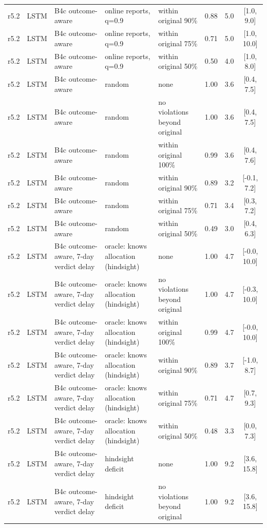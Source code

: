 \begin{longtable}{lllp{4.2cm}p{3.4cm}ccc}
r5.2 & LSTM & B4c outcome-aware & online reports, q=0.9 & within original 90\% & 0.88 & 5.0 & [1.0, 9.0] \\
r5.2 & LSTM & B4c outcome-aware & online reports, q=0.9 & within original 75\% & 0.71 & 5.0 & [1.0, 10.0] \\
r5.2 & LSTM & B4c outcome-aware & online reports, q=0.9 & within original 50\% & 0.50 & 4.0 & [1.0, 8.0] \\
r5.2 & LSTM & B4c outcome-aware & random & none & 1.00 & 3.6 & [0.4, 7.5] \\
r5.2 & LSTM & B4c outcome-aware & random & no violations beyond original & 1.00 & 3.6 & [0.4, 7.5] \\
r5.2 & LSTM & B4c outcome-aware & random & within original 100\% & 0.99 & 3.6 & [0.4, 7.6] \\
r5.2 & LSTM & B4c outcome-aware & random & within original 90\% & 0.89 & 3.2 & [-0.1, 7.2] \\
r5.2 & LSTM & B4c outcome-aware & random & within original 75\% & 0.71 & 3.4 & [0.3, 7.2] \\
r5.2 & LSTM & B4c outcome-aware & random & within original 50\% & 0.49 & 3.0 & [0.4, 6.3] \\
r5.2 & LSTM & B4c outcome-aware, 7-day verdict delay & oracle: knows allocation (hindsight) & none & 1.00 & 4.7 & [-0.0, 10.0] \\
r5.2 & LSTM & B4c outcome-aware, 7-day verdict delay & oracle: knows allocation (hindsight) & no violations beyond original & 1.00 & 4.7 & [-0.3, 10.0] \\
r5.2 & LSTM & B4c outcome-aware, 7-day verdict delay & oracle: knows allocation (hindsight) & within original 100\% & 0.99 & 4.7 & [-0.0, 10.0] \\
r5.2 & LSTM & B4c outcome-aware, 7-day verdict delay & oracle: knows allocation (hindsight) & within original 90\% & 0.89 & 3.7 & [-1.0, 8.7] \\
r5.2 & LSTM & B4c outcome-aware, 7-day verdict delay & oracle: knows allocation (hindsight) & within original 75\% & 0.71 & 4.7 & [0.7, 9.3] \\
r5.2 & LSTM & B4c outcome-aware, 7-day verdict delay & oracle: knows allocation (hindsight) & within original 50\% & 0.48 & 3.3 & [0.0, 7.3] \\
r5.2 & LSTM & B4c outcome-aware, 7-day verdict delay & hindsight deficit & none & 1.00 & 9.2 & [3.6, 15.8] \\
r5.2 & LSTM & B4c outcome-aware, 7-day verdict delay & hindsight deficit & no violations beyond original & 1.00 & 9.2 & [3.6, 15.8] \\

\end{longtable}
